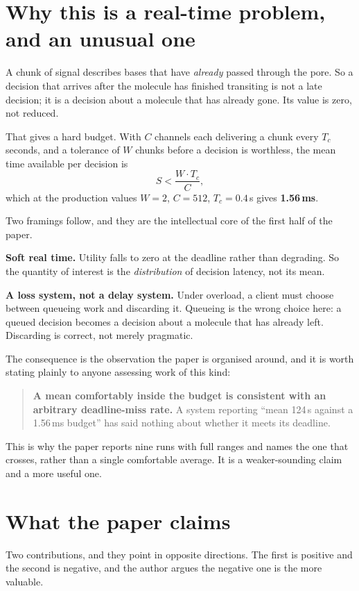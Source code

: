 \documentclass[11pt,a4paper]{article}
\begin{document}
\section{Why this is a real-time problem, and an unusual one}

A chunk of signal describes bases that have \emph{already} passed through the pore. So a
decision that arrives after the molecule has finished transiting is not a late decision; it
is a decision about a molecule that has already gone. Its value is zero, not reduced.

That gives a hard budget. With $C$ channels each delivering a chunk every $T_c$ seconds, and
a tolerance of $W$ chunks before a decision is worthless, the mean time available per
decision is
\[
S < \frac{W \cdot T_c}{C},
\]
which at the production values $W=2$, $C=512$, $T_c=0.4$\,s gives \textbf{1.56\,ms}.

Two framings follow, and they are the intellectual core of the first half of the paper.

\textbf{Soft real time.} Utility falls to zero at the deadline rather than degrading. So the
quantity of interest is the \emph{distribution} of decision latency, not its mean.

\textbf{A loss system, not a delay system.} Under overload, a client must choose between
queueing work and discarding it. Queueing is the wrong choice here: a queued decision becomes
a decision about a molecule that has already left. Discarding is correct, not merely
pragmatic.

The consequence is the observation the paper is organised around, and it is worth stating
plainly to anyone assessing work of this kind:

\begin{quote}
\textbf{A mean comfortably inside the budget is consistent with an arbitrary deadline-miss
rate.} A system reporting ``mean 124\,\textmu s against a 1.56\,ms budget'' has said nothing
about whether it meets its deadline.
\end{quote}

This is why the paper reports nine runs with full ranges and names the one that crosses,
rather than a single comfortable average. It is a weaker-sounding claim and a more useful one.

\section{What the paper claims}

Two contributions, and they point in opposite directions. The first is positive and the
second is negative, and the author argues the negative one is the more valuable.
\end{document}
